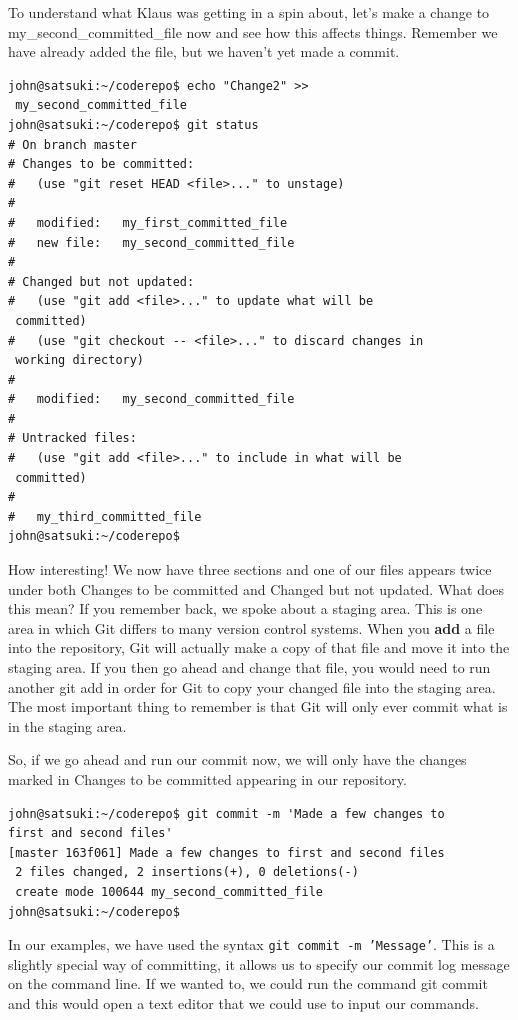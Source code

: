 To understand what Klaus was getting in a spin about, let's make a change to my\_second\_committed\_file now and see how this affects things.
Remember we have already added the file, but we haven't yet made a commit.

\begin{Verbatim}
john@satsuki:~/coderepo$ echo "Change2" >>
 my_second_committed_file
john@satsuki:~/coderepo$ git status
# On branch master
# Changes to be committed:
#   (use "git reset HEAD <file>..." to unstage)
#
#	modified:   my_first_committed_file
#	new file:   my_second_committed_file
#
# Changed but not updated:
#   (use "git add <file>..." to update what will be
 committed)
#   (use "git checkout -- <file>..." to discard changes in
 working directory)
#
#	modified:   my_second_committed_file
#
# Untracked files:
#   (use "git add <file>..." to include in what will be
 committed)
#
#	my_third_committed_file
john@satsuki:~/coderepo$
\end{Verbatim}

How interesting! We now have three sections and one of our files appears twice under both Changes to be committed and Changed but not updated.
What does this mean? If you remember back, we spoke about a staging area.
This is one area in which Git differs to many version control systems.
When you \textbf{add} a file into the repository, Git will actually make a copy of that file and move it into the staging area.
If you then go ahead and change that file, you would need to run another git add in order for Git to copy your changed file into the staging area.
The most important thing to remember is that Git will only ever commit what is in the staging area.

So, if we go ahead and run our commit now, we will only have the changes marked in Changes to be committed appearing in our repository.

\begin{Verbatim}
john@satsuki:~/coderepo$ git commit -m 'Made a few changes to
first and second files'
[master 163f061] Made a few changes to first and second files
 2 files changed, 2 insertions(+), 0 deletions(-)
 create mode 100644 my_second_committed_file
john@satsuki:~/coderepo$
\end{Verbatim}

In our examples, we have used the syntax \texttt{git commit -m 'Message'}.
This is a slightly special way of committing, it allows us to specify our commit log message on the command line.
If we wanted to, we could run the command git commit and this would open a text editor that we could use to input our commands.

